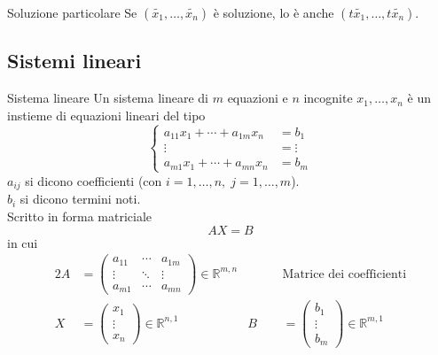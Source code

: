 \begin{SubDef}{Soluzione particolare}\label{def:lineare_equazione_soluzione_particolare_2}
  Se $(\tilde{x_1},\ldots,\tilde{x_n})$ è soluzione, lo è anche
  $(t\tilde{x_1},\ldots,t\tilde{x_n})$.
\end{SubDef}

\subsection{Sistemi lineari}%
\label{sub:sistemi_lineari}

\begin{Def}{Sistema lineare}
  Un sistema lineare di $m$ equazioni e $n$ incognite $x_1,\ldots,x_n$ è un instieme di
  equazioni lineari del tipo
  \begin{equation}\label{eq:lineare_sistema}
    \begin{cases}
      a_{11}x_1+\cdots+a_{1m}x_n &= b_1\\
      \vdots &= \vdots\\
      a_{m1}x_1+\cdots+a_{mn}x_n &= b_m
    \end{cases}
  \end{equation}
  $a_{ij}$ si dicono coefficienti (con $i=1,\ldots,n,\;j=1,\ldots,m$).\\
  $b_{i}$ si dicono termini noti.\\
  Scritto in forma matriciale
  \begin{equation*}
    AX=B
  \end{equation*}
  in cui
  \begin{alignat*}{2}
    A &=
    \begin{pmatrix}
      a_{11} & \cdots & a_{1m}\\
      \vdots & \ddots & \vdots\\
      a_{m1} & \cdots & a_{mn}
    \end{pmatrix}\in\mathbb{R}^{m,n} &\qquad &\text{Matrice dei coefficienti}\\
    X &=
    \begin{pmatrix}
      x_1\\\vdots\\x_n
    \end{pmatrix}\in\mathbb{R}^{n,1} & B &=
    \begin{pmatrix}
      b_1\\\vdots\\b_m
    \end{pmatrix}\in\mathbb{R}^{m,1}
  \end{alignat*}
\end{Def}

